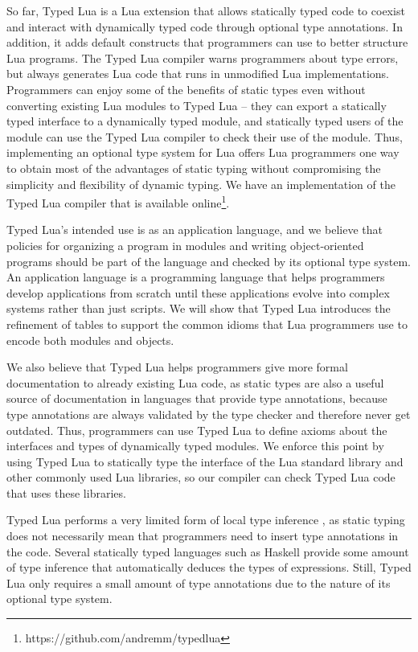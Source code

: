 So far, Typed Lua is a Lua extension that allows statically typed
code to coexist and interact with dynamically typed code
through optional type annotations.
In addition, it adds default constructs that programmers can use
to better structure Lua programs.
The Typed Lua compiler warns programmers about type errors,
but always generates Lua code that runs in unmodified Lua implementations.
Programmers can enjoy some of the benefits of static types
even without converting existing Lua modules to Typed Lua --
they can export a statically typed interface to a dynamically typed module,
and statically typed users of the module can use the Typed Lua compiler
to check their use of the module.
Thus, implementing an optional type system for Lua offers Lua
programmers one way to obtain most of the advantages of static typing
without compromising the simplicity and flexibility of dynamic typing.
We have an implementation of the Typed Lua compiler that is
available online\footnote{https://github.com/andremm/typedlua}.

Typed Lua's intended use is as an application language, and
we believe that policies for organizing a program in modules and writing
object-oriented programs should be part of the language and
checked by its optional type system.
An application language is a programming language that helps
programmers develop applications from scratch until these
applications evolve into complex systems rather than just scripts.
We will show that Typed Lua introduces the refinement of
tables to support the common idioms that Lua programmers use
to encode both modules and objects.

We also believe that Typed Lua helps programmers give more
formal documentation to already existing Lua code, as static types
are also a useful source of documentation in languages that provide
type annotations, because type annotations are always validated by
the type checker and therefore never get outdated.
Thus, programmers can use Typed Lua to define axioms about the
interfaces and types of dynamically typed modules.
We enforce this point by using Typed Lua to statically type
the interface of the Lua standard library and other commonly used
Lua libraries, so our compiler can check Typed Lua code that uses
these libraries.

Typed Lua performs a very limited form of local type inference
\citep{pierce2000lti}, as static typing does not necessarily mean
that programmers need to insert type annotations in the code.
Several statically typed languages such as Haskell provide some
amount of type inference that automatically deduces the types of
expressions.
Still, Typed Lua only requires a small amount of type annotations
due to the nature of its optional type system.

